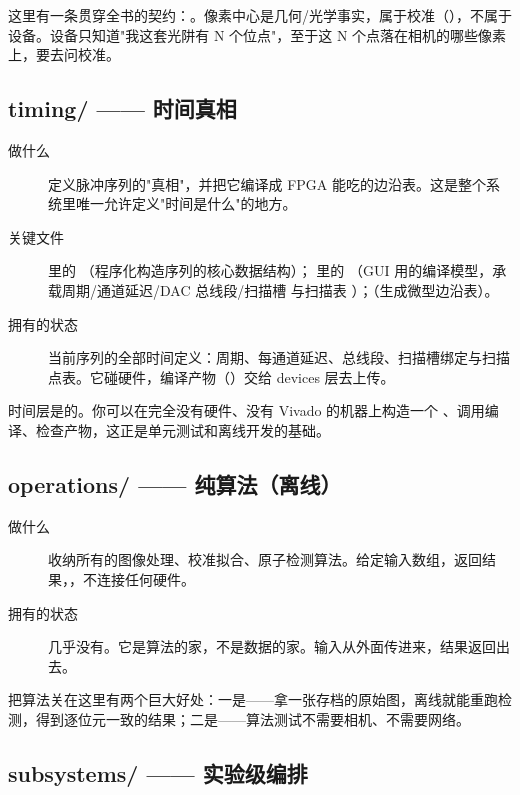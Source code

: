 \documentclass[11pt,oneside,openany]{book}
\begin{document}
这里有一条贯穿全书的契约：。像素中心是几何/光学事实，属于校准（），不属于设备。设备只知道"我这套光阱有 N 个位点"，至于这 N 个点落在相机的哪些像素上，要去问校准。

\subsection{timing/ —— 时间真相}

\begin{description}
\item[做什么] 定义脉冲序列的"真相"，并把它编译成 FPGA 能吃的边沿表。这是整个系统里唯一允许定义"时间是什么"的地方。
\item[关键文件]  里的 （程序化构造序列的核心数据结构）； 里的 （GUI 用的编译模型，承载周期/通道延迟/DAC 总线段/扫描槽  与扫描表 ）；（生成微型边沿表）。
\item[拥有的状态] 当前序列的全部时间定义：周期、每通道延迟、总线段、扫描槽绑定与扫描点表。它碰硬件，编译产物（）交给 devices 层去上传。
\end{description}

时间层是的。你可以在完全没有硬件、没有 Vivado 的机器上构造一个 、调用编译、检查产物，这正是单元测试和离线开发的基础。

\subsection{operations/ —— 纯算法（离线）}

\begin{description}
\item[做什么] 收纳所有的图像处理、校准拟合、原子检测算法。给定输入数组，返回结果，，不连接任何硬件。
\item[拥有的状态] 几乎没有。它是算法的家，不是数据的家。输入从外面传进来，结果返回出去。
\end{description}

把算法关在这里有两个巨大好处：一是——拿一张存档的原始图，离线就能重跑检测，得到逐位元一致的结果；二是——算法测试不需要相机、不需要网络。

\subsection{subsystems/ —— 实验级编排}
\end{document}
